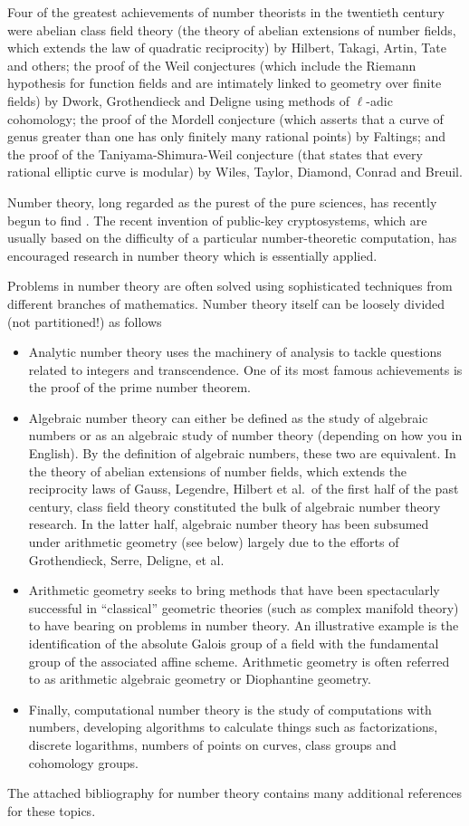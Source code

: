 \documentclass[12pt]{article}
\begin{document}
Four of the greatest achievements of number theorists in the twentieth century were abelian class field theory (the theory of abelian extensions of number fields, which extends the law of quadratic reciprocity) by Hilbert, Takagi, Artin, Tate and others; the proof of the Weil conjectures (which include the Riemann hypothesis for function fields and are intimately linked to geometry over finite fields) by Dwork, Grothendieck and Deligne using methods of $\ell$-adic cohomology; the proof of the Mordell conjecture (which asserts that a curve of genus greater than one has only finitely many rational points) by Faltings; and the proof of the Taniyama-Shimura-Weil conjecture (that states that every rational elliptic curve is modular) by Wiles, Taylor, Diamond, Conrad and Breuil.  

Number theory, long regarded as the purest of the pure sciences, has recently begun to find .  The recent invention of public-key cryptosystems, which are usually based on the difficulty of a particular number-theoretic computation, has encouraged research in number theory which is essentially applied. 

Problems in number theory are often solved using sophisticated techniques from different branches of mathematics. Number theory itself can be loosely divided (not partitioned!) as follows
\begin{itemize}
\item Analytic number theory uses the machinery of analysis to tackle questions related to integers and transcendence. One of its most famous achievements is the proof of the prime number theorem. 
\item Algebraic number theory can either be defined as the study of algebraic numbers or as an algebraic study of number theory (depending on how you  in English). By the definition of algebraic numbers, these two are equivalent. In the theory of abelian extensions of number fields, which extends the reciprocity laws of Gauss, Legendre, Hilbert et al.\ of the first half of the past century, class field theory constituted the bulk of algebraic number theory research. In the latter half, algebraic number theory has been subsumed under arithmetic geometry (see below) largely due to the efforts of Grothendieck, Serre, Deligne, et al.
\item Arithmetic geometry seeks to bring methods that have been spectacularly successful in ``classical'' geometric theories (such as complex manifold theory) to have bearing on problems in number theory. An illustrative example is the identification of the absolute Galois group of a field with the fundamental group of the associated affine scheme. Arithmetic geometry is often referred to as arithmetic algebraic geometry or Diophantine geometry.
\item Finally, computational number theory is the study of computations with numbers, developing algorithms to calculate things such as factorizations, discrete logarithms, numbers of points on curves, class groups and cohomology groups.
\end{itemize}

The attached bibliography for number theory contains many additional references for these topics.
\end{document}
